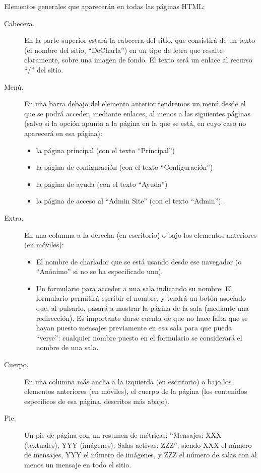 Elementos generales que aparecerán en todas las páginas HTML:

\begin{description}
\item[Cabecera.] En la parte superior estará la cabecera del sitio, que consistirá de un texto (el nombre del sitio, ``DeCharla'') en un tipo de letra que resalte claramente, sobre una imagen de fondo. El texto será un enlace al recurso ``/'' del sitio.
\item[Menú.] En una barra debajo del elemento anterior tendremos un menú desde el que se podrá acceder, mediante enlaces, al menos a las siguientes páginas (salvo si la opción apunta a la página en la que se está, en cuyo caso no aparecerá en esa página):
  \begin{itemize}
  \item la página principal (con el texto ``Principal'')
  \item la página de configuración (con el texto ``Configuración'')
  \item la página de ayuda (con el texto ``Ayuda'')
  \item la página de acceso al ``Admin Site'' (con el texto ``Admin''). 
  \end{itemize}
\item[Extra.] En una columna a la derecha (en escritorio) o bajo los elementos anteriores (en móviles):
  \begin{itemize}
  \item El nombre de charlador que se está usando desde ese navegador (o ``Anónimo'' si no se ha especificado uno).
  \item Un formulario para acceder a una sala indicando su nombre. El formulario permitirá escribir el nombre, y tendrá un botón asociado que, al pulsarlo, pasará a mostrar la página de la sala (mediante una redirección). Es importante darse cuenta de que no hace falta que se hayan puesto mensajes previamente en esa sala para que pueda ``verse'': cualquier nombre puesto en el formulario se considerará el nombre de una sala.
  \end{itemize}
\item[Cuerpo.] En una columna más ancha a la izquierda (en escritorio) o bajo los elementos anteriores (en móviles), el cuerpo de la página (los contenidos específicos de esa página, descritos más abajo).
\item[Pie.] Un pie de página con un resumen de métricas: ``Mensajes: XXX (textuales), YYY (imágenes). Salas activas: ZZZ'', siendo XXX el número de mensajes, YYY el número de imágenes, y ZZZ el número de salas con al menos un mensaje en todo el sitio.
\end{description}
  
